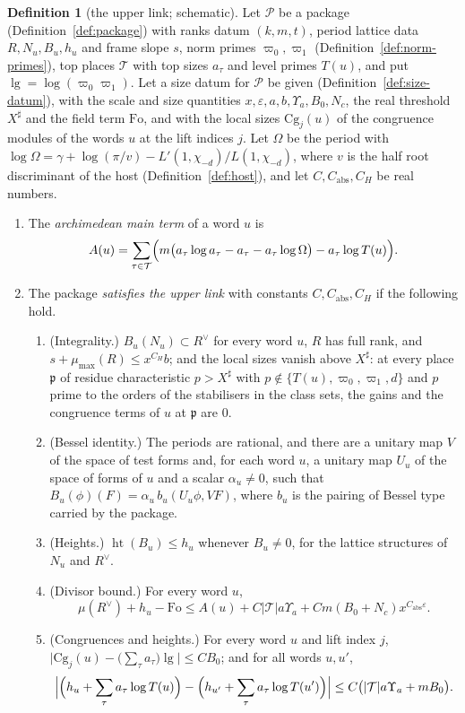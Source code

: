 \documentclass[11pt]{amsbook}
\theoremstyle{plain}
\theoremstyle{definition}
\newtheorem{definition}[theorem]{Definition}
\theoremstyle{remark}
\numberwithin{equation}{section}
\numberwithin{figure}{chapter}
\numberwithin{table}{chapter}
\newcommand{\eps}{\varepsilon}
\newcommand{\Top}{\mathcal{T}}
\newcommand{\Cg}{\mathrm{Cg}}
\newcommand{\lgv}{\operatorname{lg}}
\newcommand{\Fo}{\mathrm{Fo}}
\begin{document}
\begin{definition}[the upper link; schematic]\label{def:upper-link}
Let $\mathcal P$ be a package (Definition~\ref{def:package}) with
ranks datum $(k,m,t)$, period lattice data $R,N_u,B_u,h_u$ and frame
slope $s$, norm primes $\varpi_0,\varpi_1$
(Definition~\ref{def:norm-primes}), top places $\Top$ with top sizes
$a_\tau$ and level primes $T(u)$, and put $\lgv=\log(\varpi_0
\varpi_1)$. Let a size datum for $\mathcal P$ be given
(Definition~\ref{def:size-datum}), with the scale and size quantities
$x,\eps,a,b,\Upsilon_a,B_0,N_c$, the real threshold $X^\sharp$ and the
field term $\Fo$, and with the local sizes $\Cg_j(u)$ of the
congruence modules of the words $u$ at the lift indices $j$. Let
$\Omega$ be the period with
$\log\Omega=\gamma+\log(\pi/v)-L'(1,\chi_{-d})/L(1,\chi_{-d})$, where
$v$ is the half root discriminant of the host
(Definition~\ref{def:host}), and let $C,C_{\mathrm{abs}},C_H$ be real
numbers.
\begin{enumerate}[label=(\arabic*)]
\item The \emph{archimedean main term} of a word $u$ is
\[
A(u)=\sum_{\tau\in\Top}\Bigl(m\bigl(a_\tau\log a_\tau-a_\tau-a_\tau
\log\Omega\bigr)-a_\tau\log T(u)\Bigr).
\]
\item\label{item:ul-link}
The package \emph{satisfies the upper link} with constants
$C,C_{\mathrm{abs}},C_H$ if the following hold.
\begin{enumerate}[label=(\alph*)]
\item\label{item:ul-int}
(Integrality.) $B_u(N_u)\subset R^\vee$ for every word $u$, $R$
has full rank, and $s+\mu_{\max}(R)\le x^{C_H}b$; and the local sizes
vanish above $X^\sharp$: at every place $\mathfrak p$ of residue
characteristic $p>X^\sharp$ with $p\notin\{T(u),\varpi_0,\varpi_1,d\}$
and $p$ prime to the orders of the stabilisers in the class sets, the
gains and the congruence terms of $u$ at $\mathfrak p$ are $0$.
\item\label{item:ul-bessel}
(Bessel identity.) The periods are rational, and there are a
unitary map $V$ of the space of test forms and, for each word $u$, a
unitary map $U_u$ of the space of forms of $u$ and a scalar
$\alpha_u\ne0$, such that $B_u(\phi)(F)=\alpha_u\,
b_u(U_u\phi,VF)$, where $b_u$ is the pairing of Bessel type carried by
the package.
\item (Heights.) $\operatorname{ht}(B_u)\le h_u$ whenever $B_u\ne0$,
for the lattice structures of $N_u$ and $R^\vee$.
\item\label{item:ul-div} (Divisor bound.) For every word $u$,
\[
\mu(R^\vee)+h_u-\Fo\le A(u)+C|\Top|a\Upsilon_a
+Cm(B_0+N_c)x^{C_{\mathrm{abs}}\eps}.
\]
\item\label{item:ul-cg}
(Congruences and heights.) For every word $u$ and lift index $j$,
$\bigl|\Cg_j(u)-\bigl(\sum_\tau a_\tau\bigr)\lgv\bigr|\le CB_0$; and
for all words $u,u'$,
\[
\Bigl|\Bigl(h_u+\sum_\tau a_\tau\log T(u)\Bigr)-\Bigl(h_{u'}+\sum_\tau
a_\tau\log T(u')\Bigr)\Bigr|\le C\bigl(|\Top|a\Upsilon_a+mB_0\bigr).
\]
\end{enumerate}
\end{enumerate}
\end{definition}
\end{document}
